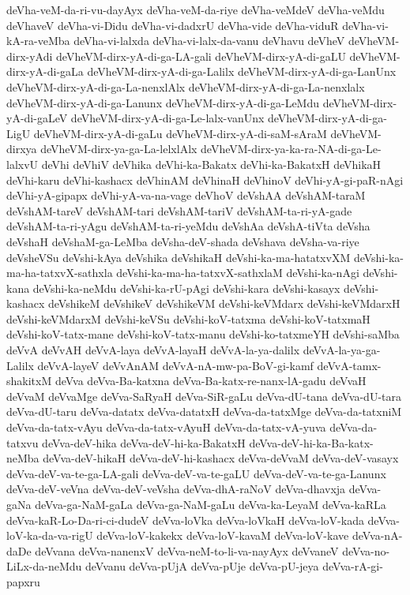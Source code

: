 {deVha-veM-da-ri-vu-dayAyx
deVha-veM-da-riye
deVha-veMdeV
deVha-veMdu
deVhaveV
deVha-vi-Didu
deVha-vi-dadxrU
deVha-vide
deVha-viduR
deVha-vi-kA-ra-veMba
deVha-vi-lalxda
deVha-vi-lalx-da-vanu
deVhavu
deVheV
deVheVM-dirx-yAdi
deVheVM-dirx-yA-di-ga-LA-gali
deVheVM-dirx-yA-di-gaLU
deVheVM-dirx-yA-di-gaLa
deVheVM-dirx-yA-di-ga-Lalilx
deVheVM-dirx-yA-di-ga-LanUnx
deVheVM-dirx-yA-di-ga-La-nenxlAlx
deVheVM-dirx-yA-di-ga-La-nenxlalx
deVheVM-dirx-yA-di-ga-Lanunx
deVheVM-dirx-yA-di-ga-LeMdu
deVheVM-dirx-yA-di-gaLeV
deVheVM-dirx-yA-di-ga-Le-lalx-vanUnx
deVheVM-dirx-yA-di-ga-LigU
deVheVM-dirx-yA-di-gaLu
deVheVM-dirx-yA-di-saM-sAraM
deVheVM-dirxya
deVheVM-dirx-ya-ga-La-lelxlAlx
deVheVM-dirx-ya-ka-ra-NA-di-ga-Le-lalxvU
deVhi
deVhiV
deVhika
deVhi-ka-Bakatx
deVhi-ka-BakatxH
deVhikaH
deVhi-karu
deVhi-kashacx
deVhinAM
deVhinaH
deVhinoV
deVhi-yA-gi-paR-nAgi
deVhi-yA-gipapx
deVhi-yA-va-na-vage
deVhoV
deVshAA
deVshAM-taraM
deVshAM-tareV
deVshAM-tari
deVshAM-tariV
deVshAM-ta-ri-yA-gade
deVshAM-ta-ri-yAgu
deVshAM-ta-ri-yeMdu
deVshAa
deVshA-tiVta
deVsha
deVshaH
deVshaM-ga-LeMba
deVsha-deV-shada
deVshava
deVsha-va-riye
deVsheVSu
deVshi-kAya
deVshika
deVshikaH
deVshi-ka-ma-hatatxvXM
deVshi-ka-ma-ha-tatxvX-sathxla
deVshi-ka-ma-ha-tatxvX-sathxlaM
deVshi-ka-nAgi
deVshi-kana
deVshi-ka-neMdu
deVshi-ka-rU-pAgi
deVshi-kara
deVshi-kasayx
deVshi-kashacx
deVshikeM
deVshikeV
deVshikeVM
deVshi-keVMdarx
deVshi-keVMdarxH
deVshi-keVMdarxM
deVshi-keVSu
deVshi-koV-tatxma
deVshi-koV-tatxmaH
deVshi-koV-tatx-mane
deVshi-koV-tatx-manu
deVshi-ko-tatxmeYH
deVshi-saMba
deVvA
deVvAH
deVvA-laya
deVvA-layaH
deVvA-la-ya-dalilx
deVvA-la-ya-ga-Lalilx
deVvA-layeV
deVvAnAM
deVvA-nA-mw-pa-BoV-gi-kamf
deVvA-tamx-shakitxM
deVva
deVva-Ba-katxna
deVva-Ba-katx-re-nanx-lA-gadu
deVvaH
deVvaM
deVvaMge
deVva-SaRyaH
deVva-SiR-gaLu
deVva-dU-tana
deVva-dU-tara
deVva-dU-taru
deVva-datatx
deVva-datatxH
deVva-da-tatxMge
deVva-da-tatxniM
deVva-da-tatx-vAyu
deVva-da-tatx-vAyuH
deVva-da-tatx-vA-yuva
deVva-da-tatxvu
deVva-deV-hika
deVva-deV-hi-ka-BakatxH
deVva-deV-hi-ka-Ba-katx-neMba
deVva-deV-hikaH
deVva-deV-hi-kashacx
deVva-deVvaM
deVva-deV-vasayx
deVva-deV-va-te-ga-LA-gali
deVva-deV-va-te-gaLU
deVva-deV-va-te-ga-Lanunx
deVva-deV-veVna
deVva-deV-veVsha
deVva-dhA-raNoV
deVva-dhavxja
deVva-gaNa
deVva-ga-NaM-gaLa
deVva-ga-NaM-gaLu
deVva-ka-LeyaM
deVva-kaRLa
deVva-kaR-Lo-Da-ri-ci-dudeV
deVva-loVka
deVva-loVkaH
deVva-loV-kada
deVva-loV-ka-da-va-rigU
deVva-loV-kakekx
deVva-loV-kavaM
deVva-loV-kave
deVva-nA-daDe
deVvana
deVva-nanenxV
deVva-neM-to-li-va-nayAyx
deVvaneV
deVva-no-LiLx-da-neMdu
deVvanu
deVva-pUjA
deVva-pUje
deVva-pU-jeya
deVva-rA-gi-papxru
}
